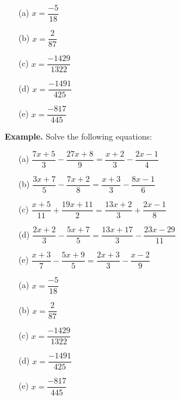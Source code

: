 \documentclass[12pt]{article}
\begin{document}
\vfill

\begin{enumerate}
	\item[(a)] $x = \dfrac{-5}{18}$
	\item[(b)] $x = \dfrac{2}{87}$
	\item[(c)] $x = \dfrac{-1429}{1322}$
	\item[(d)] $x = \dfrac{-1491}{425}$
	\item[(e)] $x = \dfrac{-817}{445}$
\end{enumerate}

\newpage

\textbf{Example.} Solve the following equations:
\begin{enumerate}
	\item[(a)] $\dfrac{7x + 5}{3} - \dfrac{27x + 8}{9} = \dfrac{x + 2}{3} - \dfrac{2x - 1}{4}$
	\item[(b)] $\dfrac{3x + 7}{5} - \dfrac{7x + 2}{8} = \dfrac{x + 3}{3} - \dfrac{8x - 1}{6}$
	\item[(c)] $\dfrac{x + 5}{11} + \dfrac{19x + 11}{2} = \dfrac{13x + 2}{3} + \dfrac{2x - 1}{8}$
	\item[(d)] $\dfrac{2x + 2}{3} - \dfrac{5x + 7}{5} = \dfrac{13x + 17}{3} - \dfrac{23x - 29}{11}$
	\item[(e)] $\dfrac{x + 3}{7} - \dfrac{5x + 9}{5} = \dfrac{2x + 3}{3} - \dfrac{x - 2}{9}$
\end{enumerate}

\vfill

\begin{enumerate}
	\item[(a)] $x = \dfrac{-5}{18}$
	\item[(b)] $x = \dfrac{2}{87}$
	\item[(c)] $x = \dfrac{-1429}{1322}$
	\item[(d)] $x = \dfrac{-1491}{425}$
	\item[(e)] $x = \dfrac{-817}{445}$
\end{enumerate}
\end{document}
